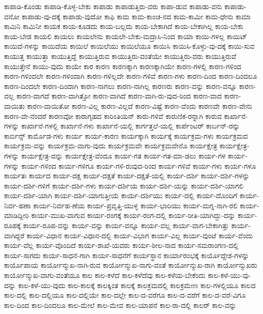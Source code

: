 {ಕಾಪಾಡಿ-ಕೊಂಡು
ಕಾಪಾಡಿ-ಕೊಳ್ಳ-ಬೇಕು
ಕಾಪಾಡು
ಕಾಪಾಡುತ್ತಿರು-ವರು
ಕಾಪಾ-ಡುವ
ಕಾಪಾಡು-ವನು
ಕಾಪಾಡು-ವನೋ
ಕಾಪಾಡು-ವು-ದಕ್ಕೆ
ಕಾಪಾಡು-ವುದೋ
ಕಾಫಿ
ಕಾಮ
ಕಾಮ-ಕಾಂಚ-ನದ
ಕಾಮ-ಕಾಮೀ
ಕಾಮ-ಧೇನು
ಕಾಮಾ
ಕಾಮಿನಿ
ಕಾಮಿನೀ
ಕಾಯಕ
ಕಾಯ-ಕೂಡದು
ಕಾಯ-ಬಲ್ಲದು
ಕಾಯ-ಬೇಕಾಗಿದೆ
ಕಾಯ-ಬೇಕಾಗಿಲ್ಲ
ಕಾಯ-ಬೇಕು
ಕಾಯ-ಬೇಡ
ಕಾಯಲಿ
ಕಾಯಲು
ಕಾಯಲೇನು
ಕಾಯಲೇ-ಬೇಕು-ಮದ್ರಾಸಿ-ನಿಂದ
ಕಾಯಾ
ಕಾಯಿ-ಗಳಲ್ಲ
ಕಾಯಿಟ್
ಕಾಯಿದೆ-ಗಳನ್ನು
ಕಾಯಿದೆಯ
ಕಾಯಿಲೆ
ಕಾಯಿಲೆಯು
ಕಾಯಿಲೆಯೂ
ಕಾಯಿಸಿ
ಕಾಯಿಸಿ-ಕೊಳ್ಳು-ವು-ದಕ್ಕೆ
ಕಾಯಿ-ಸುವ
ಕಾಯುತ್ತ
ಕಾಯುತ್ತಾ
ಕಾಯುತ್ತಿದ್ದೆ
ಕಾಯುತ್ತಿರುವ
ಕಾಯುತ್ತಿರು-ವಂತೆಯೇ
ಕಾಯುತ್ತಿರು-ವರು
ಕಾಯುತ್ತಿರುವೆ
ಕಾಯುತ್ತೇನೆ
ಕಾಯು-ವುದು
ಕಾಯೇ
ಕಾರ
ಕಾರಣ
ಕಾರಣಕ್ಕಾಗಿ
ಕಾರಣಕ್ಕಾಗಿಯೇ
ಕಾರಣ-ಗಳಲ್ಲಿ
ಕಾರಣ-ಗಳಿಂದ
ಕಾರಣ-ಗಳಿಂದಲೇ
ಕಾರಣ-ಗಳಿಂದಾಗಿ
ಕಾರಣ-ಗಳಿಲ್ಲದೇ
ಕಾರಣ-ಗಳಿವೆ
ಕಾರಣ-ಗಳು
ಕಾರಣ-ದಿಂದ
ಕಾರಣ-ದಿಂದಲೂ
ಕಾರಣ-ದಿಂದಲೇ
ಕಾರಣ-ದಿಂದಾಗಿ
ಕಾರಣ-ನಾಗಲು
ಕಾರಣ-ನಾಗಿಲ್ಲ
ಕಾರಣರು
ಕಾರಣ-ವನ್ನು
ಕಾರಣ-ವನ್ನೂ
ಕಾರಣ-ವಲ್ಲ
ಕಾರಣ-ವಾಗದೆ
ಕಾರಣ-ವಾಗಿತ್ತೋ
ಕಾರಣ-ವಾಗಿದೆ
ಕಾರಣ-ವಾಗಿ-ರು-ವುದ-ರಿಂದ
ಕಾರಣ-ವಾದ
ಕಾರಣ-ವಾಯಿತು
ಕಾರಣ-ವಾಯಿತೋ
ಕಾರಣ-ವಿಲ್ಲ
ಕಾರಣ-ವಿಲ್ಲದೆ
ಕಾರಣ-ವಿಷ್ಟೆ
ಕಾರಣ-ವೆಂದು
ಕಾರಣವೇ
ಕಾರಣ-ವೇನು
ಕಾರಣ-ವೇ-ನೆಂದರೆ
ಕಾರಣವೋ
ಕಾರಾಗೃಹದ
ಕಾರಿಂತಿಯನ್
ಕಾರು-ಗಳಿವೆ
ಕಾರುಣಿಕ-ರನ್ನಾಗಿ
ಕಾರುವ
ಕಾರ್ಖಾನೆ-ಗಳನ್ನು
ಕಾರ್ಖಾನೆ-ಗಳಲ್ಲಿ
ಕಾರ್ಖಾನೆ-ಗಳು
ಕಾರ್ಖಾನೆ-ಯಲ್ಲಿ
ಕಾರ್ಗತ್ತಲೆ-ಯಲ್ಲಿ
ಕಾರ್ಪೆಂಟರ್
ಕಾರ್ಬನ್-ರನ್ನು
ಕಾರ್ಬಿನ್ಸ್
ಕಾರ್ಮೊಡ-ಗಳು
ಕಾರ್ಯ
ಕಾರ್ಯ-ಕಾರಣ
ಕಾರ್ಯಕ್ಕಾಗಿ
ಕಾರ್ಯಕ್ಕೆ
ಕಾರ್ಯಕ್ರಮ-ಗಳು
ಕಾರ್ಯಕ್ರಮದ
ಕಾರ್ಯಕ್ರಮ-ವನ್ನು
ಕಾರ್ಯಕ್ರಮ-ವಾಗು-ವುದು
ಕಾರ್ಯಕ್ರಮವೇ
ಕಾರ್ಯಕ್ರಮವೇನೊ
ಕಾರ್ಯಕ್ಷೇತ್ರ
ಕಾರ್ಯಕ್ಷೇತ್ರ-ಗಳನ್ನು
ಕಾರ್ಯಕ್ಷೇತ್ರ-ವನ್ನು
ಕಾರ್ಯಕ್ಷೇತ್ರ-ವೆಂದೂ
ಕಾರ್ಯ-ಗತ
ಕಾರ್ಯ-ಗತ-ಮಾ-ಡಲು
ಕಾರ್ಯ-ಗಳ
ಕಾರ್ಯ-ಗಳನ್ನು
ಕಾರ್ಯ-ಗಳಿಂದ
ಕಾರ್ಯ-ಗಳಿಗೂ
ಕಾರ್ಯ-ಗಳಿ-ರುವುದ-ರಿಂದ
ಕಾರ್ಯ-ಗಳಿವೆ
ಕಾರ್ಯ-ಗಳು
ಕಾರ್ಯ-ಗಳೂ
ಕಾರ್ಯತಃ
ಕಾರ್ಯದ
ಕಾರ್ಯ-ದಕ್ಷ
ಕಾರ್ಯ-ದಕ್ಷತೆ
ಕಾರ್ಯ-ದಕ್ಷತೆ-ಯಲ್ಲಿ
ಕಾರ್ಯ-ದರ್ಶಿ
ಕಾರ್ಯ-ದರ್ಶಿ-ಗಳನ್ನು
ಕಾರ್ಯ-ದರ್ಶಿ-ಗಳಿಗೆ
ಕಾರ್ಯ-ದರ್ಶಿ-ಗಳು
ಕಾರ್ಯ-ದರ್ಶಿಯ
ಕಾರ್ಯ-ದರ್ಶಿ-ಯನ್ನು
ಕಾರ್ಯ-ದರ್ಶಿ-ಯಾಗಲಿ
ಕಾರ್ಯ-ದರ್ಶಿ-ಯಾಗಿ
ಕಾರ್ಯ-ದರ್ಶಿ-ಯಾಗುತ್ತೀಯೆ
ಕಾರ್ಯ-ದರ್ಶಿಯು
ಕಾರ್ಯ-ದಲ್ಲಿ
ಕಾರ್ಯ-ದೊಂದಿಗೆ
ಕಾರ್ಯ-ನಿರ್ವ-ಹಣಾ
ಕಾರ್ಯ-ನಿರ್ವಹ-ಣೆಯ
ಕಾರ್ಯ-ಪ್ರವೃತ್ತಿ-ಯುಳ್ಳ
ಕಾರ್ಯ-ಭಾರಿಯು
ಕಾರ್ಯ-ಮಗ್ನ-ನಾಗಿ-ರಲಿ
ಕಾರ್ಯ-ಮಾಡಿದ್ದೀರಿ
ಕಾರ್ಯ-ಮುಖ-ವಾಗುವ
ಕಾರ್ಯ-ರಂಗಕ್ಕೆ
ಕಾರ್ಯ-ರಂಗ-ದಲ್ಲಿ
ಕಾರ್ಯ-ರೀತಿ-ಯಾಗಿದ್ದು-ದನ್ನು
ಕಾರ್ಯ-ರೂಪಕ್ಕೆ
ಕಾರ್ಯ-ರೂಪ-ವನ್ನು
ಕಾರ್ಯ-ವನ್ನು
ಕಾರ್ಯ-ವನ್ನೂ
ಕಾರ್ಯ-ವಲ್ಲ
ಕಾರ್ಯ-ವಾಗ-ಬೇಕಾಗಿತ್ತು
ಕಾರ್ಯ-ವಾಗಿದ್ದರೆ
ಕಾರ್ಯ-ವಿಧಾನ
ಕಾರ್ಯ-ವಿಧಾನ-ದಲ್ಲಿ
ಕಾರ್ಯ-ವಿಭಾಗ
ಕಾರ್ಯ-ವಿಲ್ಲ
ಕಾರ್ಯ-ವುಂಟೆ
ಕಾರ್ಯ-ವೆಂದು
ಕಾರ್ಯ-ವೆಲ್ಲ
ಕಾರ್ಯ-ವೊಂದಿದೆ
ಕಾರ್ಯ-ಶಾಖೆ-ಯವರು
ಕಾರ್ಯ-ಶೀಲ-ನಾದ
ಕಾರ್ಯ-ಸಮರಾಂಗಣ-ದಲ್ಲಿ
ಕಾರ್ಯ-ಸಾಗದು
ಕಾರ್ಯ-ಸಾಧನೆ-ಗಾಗಿ
ಕಾರ್ಯ-ಸಾಧನೆಗೆ
ಕಾರ್ಯಸ್ಥಾನ
ಕಾರ್ಯಾರಂಭಕ್ಕೆ
ಕಾರ್ಯೊದ್ದೇಶ-ಗಳನ್ನು
ಕಾರ್ಯೊಪಾಯ
ಕಾರ್ಯೋನ್ಮುಖ-ನಾಗಿ-ರುವ
ಕಾರ್ಯೋನ್ಮುಖ-ನಾಗು-ವಂತೆ
ಕಾರ್ಯೋನ್ಮುಖ-ರಾಗಿ
ಕಾರ್ಯೋನ್ಮುಖರು
ಕಾರ್ಯೋನ್ಮುಖ-ವಾಗು-ವಂತೆಯೂ
ಕಾಲ
ಕಾಲ-ಕಳೆದೆ
ಕಾಲ-ಕಳೆದೆವು
ಕಾಲ-ಕಳೆಯ-ಬೇಕೆಂದು
ಕಾಲ-ಕಳೆ-ಯು-ವು-ದನ್ನು
ಕಾಲ-ಕಳೆ-ಯು-ವುದು
ಕಾಲ-ಕಾಲಕ್ಕೆ
ಕಾಲಕ್ಕಿಂತ
ಕಾಲಕ್ಕೆ
ಕಾಲಕ್ರಮದಲ್ಲಿ
ಕಾಲಕ್ರಮೇಣ
ಕಾಲ-ಗಳಲ್ಲಿಯೂ
ಕಾಲದ
ಕಾಲ-ದಲ್ಲಿ
ಕಾಲ-ದಲ್ಲಿಯೂ
ಕಾಲ-ದಲ್ಲಿಯೇ
ಕಾಲ-ದಲ್ಲೇ
ಕಾಲ-ದ-ವರೆಗೂ
ಕಾಲ-ದ-ವರೆಗೆ
ಕಾಲ-ದ-ವರೆ-ವಿಗೂ
ಕಾಲ-ದಿಂದ
ಕಾಲ-ದಿಂದಲೂ
ಕಾಲ-ಮೇಲೆ
ಕಾಲ-ಮೇವ
ಕಾಲ-ಯಾಪನೆ
ಕಾಲ-ರಾ-ದಲ್ಲಿ
ಕಾಲರ್
ಕಾಲ-ವನ್ನು
}
